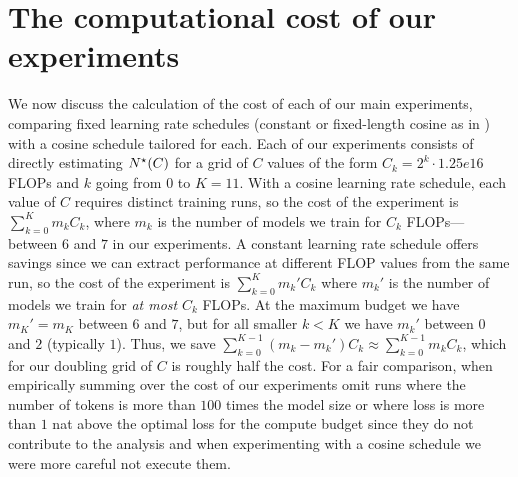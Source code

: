 \documentclass{article}
\theoremstyle{plain}
\theoremstyle{definition}
\theoremstyle{remark}
\newcommand{\maybeSubscript}[1]{
  \ifthenelse{\equal{#1}{}}{}{_{#1}}%
}
\newcommand{\params}[1][]{N\maybeSubscript{#1}}
\newcommand{\paramsStar}[1][]{\params[#1]^{\star}}
\newcommand{\tentative}[1]{{\bf \color{red} #1}}
\renewcommand{\tentative}[1]{#1\xspace}
\begin{document}
\section{The computational cost of our experiments}\label{app:compute-cost}

We now discuss the calculation of the cost of each of our main experiments, comparing fixed learning rate schedules (constant or fixed-length cosine as in \citet{kaplan2020scaling}) with a cosine schedule tailored for each. 
Each of our experiments consists of directly estimating $\paramsStar(C)$ for a grid of $C$ values of the form $C_k = 2^{k} \cdot \tentative{1.25e16}$ FLOPs and $k$ going from $0$ to $K=\tentative{11}$. With a cosine learning rate schedule, each value of $C$ requires distinct training runs, so the cost of the experiment is $\sum_{k=0}^K m_k C_k$, where $m_k$ is the number of models we train for $C_k$ FLOPs---between $6$ and $7$ in our experiments. A constant learning rate schedule offers savings since we can extract performance at different FLOP values from the same run, so the cost of the experiment is $\sum_{k=0}^K m_k' C_k$ where $m_k'$ is the number of models we train for \emph{at most} $C_k$ FLOPs. At the maximum budget we have $m_K'=m_K$ between $6$ and $7$, but for all smaller $k<K$ we have $m_k'$ between $0$ and $2$ (typically $1$). Thus, we save $\sum_{k=0}^{K-1} (m_k-m_k')C_k \approx \sum_{k=0}^{K-1}m_k C_k$, which for our doubling grid of $C$ is roughly half the cost. For a fair comparison, when empirically summing over the cost of our experiments omit runs where the number of tokens is more than $100$ times the model size or where loss is more than $1$ nat above the optimal loss for the compute budget since they do not contribute to the analysis and when experimenting with a cosine schedule we were more careful not execute them. %
%
%
%
\end{document}
